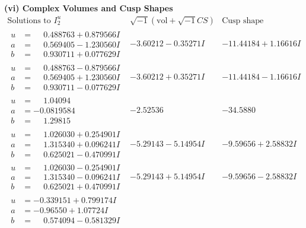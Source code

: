 \documentclass[1p]{elsarticle_modified}
\theoremstyle{definition}
\newcommand{\I}{\sqrt{-1}}
\begin{document}
\newpage\flushleft \textbf{(vi) Complex Volumes and Cusp Shapes}
$$\begin{array}{c|c|c}  
\text{Solutions to }I^u_{2}& \I (\text{vol} + \sqrt{-1}CS) & \text{Cusp shape}\\
 \hline 
\begin{aligned}
u &= \phantom{-}0.488763 + 0.879566 I \\
a &= \phantom{-}0.569405 - 1.230560 I \\
b &= \phantom{-}0.930711 + 0.077629 I\end{aligned}
 & -3.60212 - 0.35271 I & -11.44184 + 1.16616 I \\ \hline\begin{aligned}
u &= \phantom{-}0.488763 - 0.879566 I \\
a &= \phantom{-}0.569405 + 1.230560 I \\
b &= \phantom{-}0.930711 - 0.077629 I\end{aligned}
 & -3.60212 + 0.35271 I & -11.44184 - 1.16616 I \\ \hline\begin{aligned}
u &= \phantom{-}1.04094\phantom{ +0.000000I} \\
a &= -0.0819584\phantom{ +0.000000I} \\
b &= \phantom{-}1.29815\phantom{ +0.000000I}\end{aligned}
 & -2.52536\phantom{ +0.000000I} & -34.5880\phantom{ +0.000000I} \\ \hline\begin{aligned}
u &= \phantom{-}1.026030 + 0.254901 I \\
a &= \phantom{-}1.315340 + 0.096241 I \\
b &= \phantom{-}0.625021 - 0.470991 I\end{aligned}
 & -5.29143 - 5.14954 I & -9.59656 + 2.58832 I \\ \hline\begin{aligned}
u &= \phantom{-}1.026030 - 0.254901 I \\
a &= \phantom{-}1.315340 - 0.096241 I \\
b &= \phantom{-}0.625021 + 0.470991 I\end{aligned}
 & -5.29143 + 5.14954 I & -9.59656 - 2.58832 I \\ \hline\begin{aligned}
u &= -0.339151 + 0.799174 I \\
a &= -0.96550 + 1.07724 I \\
b &= \phantom{-}0.574094 - 0.581329 I\end{aligned}

\end{array}$$
\end{document}
